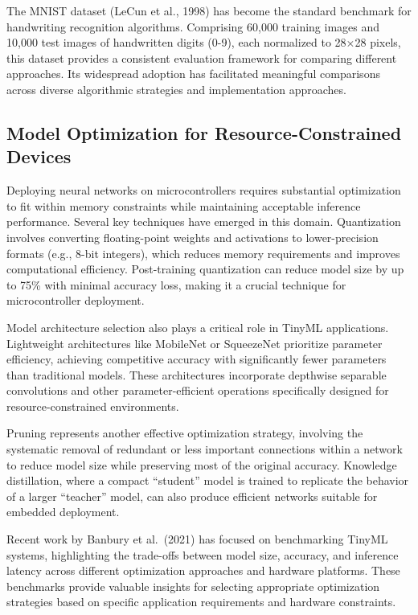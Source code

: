 \documentclass[
  9pt,
  letterpaper,
  abstract,
  titlepage]{scrbook}
\begin{document}
The MNIST dataset (LeCun et al., 1998) has become the standard benchmark
for handwriting recognition algorithms. Comprising 60,000 training
images and 10,000 test images of handwritten digits (0-9), each
normalized to 28×28 pixels, this dataset provides a consistent
evaluation framework for comparing different approaches. Its widespread
adoption has facilitated meaningful comparisons across diverse
algorithmic strategies and implementation approaches.

\subsection{Model Optimization for Resource-Constrained
Devices}\label{model-optimization-for-resource-constrained-devices}

Deploying neural networks on microcontrollers requires substantial
optimization to fit within memory constraints while maintaining
acceptable inference performance. Several key techniques have emerged in
this domain. Quantization involves converting floating-point weights and
activations to lower-precision formats (e.g., 8-bit integers), which
reduces memory requirements and improves computational efficiency.
Post-training quantization can reduce model size by up to 75\% with
minimal accuracy loss, making it a crucial technique for microcontroller
deployment.

Model architecture selection also plays a critical role in TinyML
applications. Lightweight architectures like MobileNet or SqueezeNet
prioritize parameter efficiency, achieving competitive accuracy with
significantly fewer parameters than traditional models. These
architectures incorporate depthwise separable convolutions and other
parameter-efficient operations specifically designed for
resource-constrained environments.

Pruning represents another effective optimization strategy, involving
the systematic removal of redundant or less important connections within
a network to reduce model size while preserving most of the original
accuracy. Knowledge distillation, where a compact ``student'' model is
trained to replicate the behavior of a larger ``teacher'' model, can
also produce efficient networks suitable for embedded deployment.

Recent work by Banbury et al.~(2021) has focused on benchmarking TinyML
systems, highlighting the trade-offs between model size, accuracy, and
inference latency across different optimization approaches and hardware
platforms. These benchmarks provide valuable insights for selecting
appropriate optimization strategies based on specific application
requirements and hardware constraints.
\end{document}
